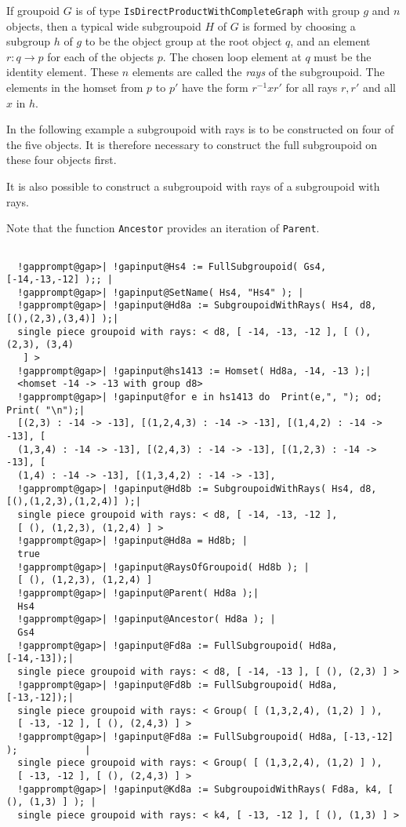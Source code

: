\documentclass[a4paper,11pt]{report}
\begin{document}
{{{ If groupoid $G$ is of type \texttt{IsDirectProductWithCompleteGraph} with group $g$ and $n$ objects, then a typical wide subgroupoid $H$ of $G$ is formed by choosing a subgroup $h$ of $g$ to be the object group at the root object $q$, and an element $r : q \to p$ for each of the objects $p$. The chosen loop element at $q$ must be the identity element. These $n$ elements are called the  \emph{rays} of the subgroupoid. The elements in the homset from $p$ to $p'$ have the form $r^{-1}xr'$ for all rays $r,r'$ and all $x$ in $h$. 

 In the following example a subgroupoid with rays is to be constructed on four
of the five objects. It is therefore necessary to construct the full
subgroupoid on these four objects first. 

 It is also possible to construct a subgroupoid with rays of a subgroupoid with
rays. 

 Note that the function  \texttt{Ancestor} provides an iteration of \texttt{Parent}. 

 }

 
\begin{Verbatim}[commandchars=!@|,fontsize=\small,frame=single,label=Example]
  
  !gapprompt@gap>| !gapinput@Hs4 := FullSubgroupoid( Gs4, [-14,-13,-12] );; |
  !gapprompt@gap>| !gapinput@SetName( Hs4, "Hs4" ); |
  !gapprompt@gap>| !gapinput@Hd8a := SubgroupoidWithRays( Hs4, d8, [(),(2,3),(3,4)] );|
  single piece groupoid with rays: < d8, [ -14, -13, -12 ], [ (), (2,3), (3,4)
   ] >
  !gapprompt@gap>| !gapinput@hs1413 := Homset( Hd8a, -14, -13 );|
  <homset -14 -> -13 with group d8>
  !gapprompt@gap>| !gapinput@for e in hs1413 do  Print(e,", "); od;  Print( "\n");|
  [(2,3) : -14 -> -13], [(1,2,4,3) : -14 -> -13], [(1,4,2) : -14 -> -13], [
  (1,3,4) : -14 -> -13], [(2,4,3) : -14 -> -13], [(1,2,3) : -14 -> -13], [
  (1,4) : -14 -> -13], [(1,3,4,2) : -14 -> -13], 
  !gapprompt@gap>| !gapinput@Hd8b := SubgroupoidWithRays( Hs4, d8, [(),(1,2,3),(1,2,4)] );|
  single piece groupoid with rays: < d8, [ -14, -13, -12 ],
  [ (), (1,2,3), (1,2,4) ] >
  !gapprompt@gap>| !gapinput@Hd8a = Hd8b; |
  true
  !gapprompt@gap>| !gapinput@RaysOfGroupoid( Hd8b ); |
  [ (), (1,2,3), (1,2,4) ]
  !gapprompt@gap>| !gapinput@Parent( Hd8a );|
  Hs4
  !gapprompt@gap>| !gapinput@Ancestor( Hd8a ); |
  Gs4
  !gapprompt@gap>| !gapinput@Fd8a := FullSubgroupoid( Hd8a, [-14,-13]);|
  single piece groupoid with rays: < d8, [ -14, -13 ], [ (), (2,3) ] >
  !gapprompt@gap>| !gapinput@Fd8b := FullSubgroupoid( Hd8a, [-13,-12]);|
  single piece groupoid with rays: < Group( [ (1,3,2,4), (1,2) ] ), 
  [ -13, -12 ], [ (), (2,4,3) ] >
  !gapprompt@gap>| !gapinput@Fd8a := FullSubgroupoid( Hd8a, [-13,-12] );            |
  single piece groupoid with rays: < Group( [ (1,3,2,4), (1,2) ] ), 
  [ -13, -12 ], [ (), (2,4,3) ] >
  !gapprompt@gap>| !gapinput@Kd8a := SubgroupoidWithRays( Fd8a, k4, [ (), (1,3) ] ); |
  single piece groupoid with rays: < k4, [ -13, -12 ], [ (), (1,3) ] >
  

\end{Verbatim}}}
\end{document}
